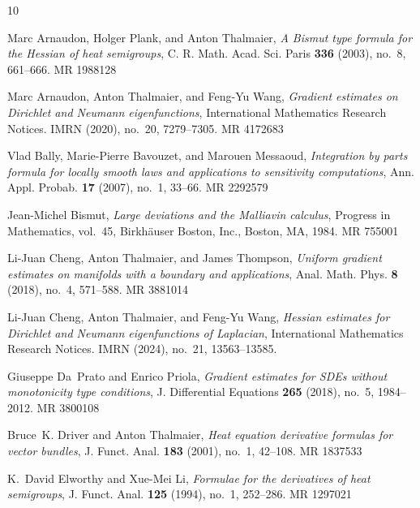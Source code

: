 \documentclass[11pt,twoside, reqno]{article}
\newcommand\1{\mathbbm{1}}
\theoremstyle{definition}
\numberwithin{equation}{section}
\begin{document}
\providecommand{\bysame}{\leavevmode\hbox to3em{\hrulefill}\thinspace}
\providecommand{\MR}{\relax\ifhmode\unskip\space\fi MR }
\providecommand{\MRhref}[2]{%
  \href{http://www.ams.org/mathscinet-getitem?mr=#1}{#2}
}
\providecommand{\href}[2]{#2}
\begin{thebibliography}{10}

Marc Arnaudon, Holger Plank, and Anton Thalmaier, \emph{A {B}ismut type formula
  for the {H}essian of heat semigroups}, C. R. Math. Acad. Sci. Paris
  \textbf{336} (2003), no.~8, 661--666. \MR{1988128}

Marc Arnaudon, Anton Thalmaier, and Feng-Yu Wang, \emph{Gradient estimates on
  {D}irichlet and {N}eumann eigenfunctions}, International Mathematics Research
  Notices. IMRN (2020), no.~20, 7279--7305. \MR{4172683}

Vlad Bally, Marie-Pierre Bavouzet, and Marouen Messaoud, \emph{Integration by
  parts formula for locally smooth laws and applications to sensitivity
  computations}, Ann. Appl. Probab. \textbf{17} (2007), no.~1, 33--66.
  \MR{2292579}

Jean-Michel Bismut, \emph{Large deviations and the {M}alliavin calculus},
  Progress in Mathematics, vol.~45, Birkh\"{a}user Boston, Inc., Boston, MA,
  1984. \MR{755001}

Li-Juan Cheng, Anton Thalmaier, and James Thompson, \emph{Uniform gradient
  estimates on manifolds with a boundary and applications}, Anal. Math. Phys.
  \textbf{8} (2018), no.~4, 571--588. \MR{3881014}

Li-Juan Cheng, Anton Thalmaier, and Feng-Yu Wang, \emph{Hessian estimates for
  {D}irichlet and {N}eumann eigenfunctions of {L}aplacian}, International
  Mathematics Research Notices. IMRN (2024), no.~21, 13563--13585.

Giuseppe Da~Prato and Enrico Priola, \emph{Gradient estimates for {SDE}s
  without monotonicity type conditions}, J. Differential Equations \textbf{265}
  (2018), no.~5, 1984--2012. \MR{3800108}

Bruce~K. Driver and Anton Thalmaier, \emph{Heat equation derivative formulas
  for vector bundles}, J. Funct. Anal. \textbf{183} (2001), no.~1, 42--108.
  \MR{1837533}

K.~David Elworthy and Xue-Mei Li, \emph{Formulae for the derivatives of heat
  semigroups}, J. Funct. Anal. \textbf{125} (1994), no.~1, 252--286.
  \MR{1297021}


\end{thebibliography}
\end{document}
